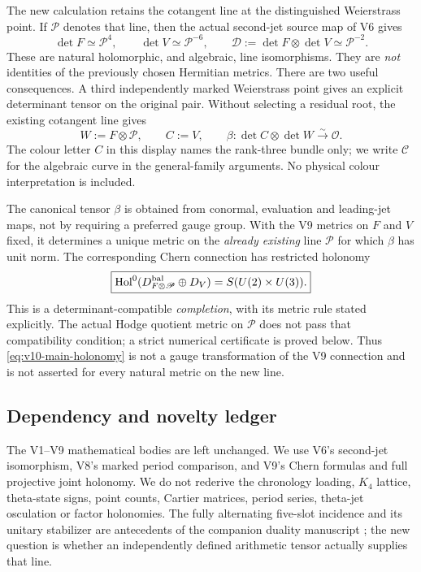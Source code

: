 \documentclass[11pt]{article}
\theoremstyle{definition}
\theoremstyle{remark}
\begin{document}
The new calculation retains the cotangent line at the distinguished
Weierstrass point. If $\mathscr P$ denotes that line, then the actual
second-jet source map of V6 gives
\begin{equation}
 \boxed{\det F\simeq\mathscr P^4,\qquad
 \det V\simeq\mathscr P^{-6},\qquad
 \mathscr D:=\det F\otimes\det V\simeq\mathscr P^{-2}.}
 \label{eq:v10-main-lines}
\end{equation}
These are natural holomorphic, and algebraic, line isomorphisms. They are
\emph{not} identities of the previously chosen Hermitian metrics.
There are two useful consequences. A third independently marked
Weierstrass point gives an explicit determinant tensor on the original
pair. Without selecting a residual root, the existing cotangent line gives
\begin{equation}
 \boxed{W:=F\otimes\mathscr P,\qquad C:=V,\qquad
 \beta:\det C\otimes\det W\xrightarrow{\sim}\mathcal O.}
 \label{eq:v10-main-beta}
\end{equation}
The colour letter $C$ in this display names the rank-three bundle only;
we write $\mathcal C$ for the algebraic curve in the general-family
arguments. No physical colour interpretation is included.

The canonical tensor $\beta$ is obtained from conormal, evaluation and
leading-jet maps, not by requiring a preferred gauge group. With the V9
metrics on $F$ and $V$ fixed, it determines a unique metric on the
\emph{already existing} line $\mathscr P$ for which $\beta$ has unit norm.
The corresponding Chern connection has restricted holonomy
\begin{equation}
 \boxed{\operatorname{Hol}^{0}
       (D_{F\otimes\mathscr P}^{\rm bal}\oplus D_V)
       =S(U(2)\times U(3)).}
 \label{eq:v10-main-holonomy}
\end{equation}
This is a determinant-compatible \emph{completion}, with its metric rule
stated explicitly. The actual Hodge quotient metric on $\mathscr P$ does
not pass that compatibility condition; a strict numerical certificate is
proved below. Thus \cref{eq:v10-main-holonomy} is not a gauge transformation
of the V9 connection and is not asserted for every natural metric on the
new line.

\subsection{Dependency and novelty ledger}
The V1--V9 mathematical bodies are left unchanged. We use V6's second-jet
isomorphism, V8's marked period comparison, and V9's Chern formulas and
full projective joint holonomy. We do not rederive the chronology loading,
$K_4$ lattice, theta-state signs, point counts, Cartier matrices, period
series, theta-jet osculation or factor holonomies. The fully alternating
five-slot incidence and its unitary stabilizer are antecedents of the
companion duality manuscript \cite{Duality}; the new question is whether
an independently defined arithmetic tensor actually supplies that line.
\end{document}
